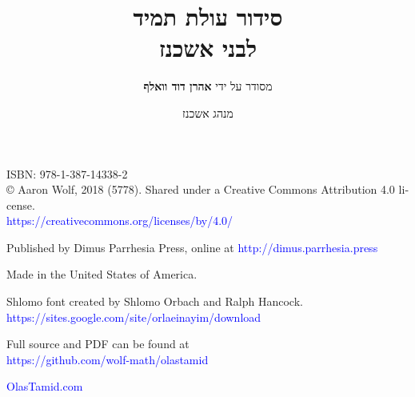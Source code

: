 \documentclass[twoside, openany, parskip=half, 11pt]{book}
\begin{document}
\title{  סידור עולת תמיד \\
לבני אשכנז\\
\vspace{.5in}
 }

\author{מסודר על ידי 
\textbf{אהרן דוד וואלף}}
\date{מנהג אשכנז}

\maketitle

\begin{minipage}{\textwidth}
\begin{english}
\raggedright

ISBN: 978-1-387-14338-2\\

© Aaron Wolf, 2018 (5778). Shared under a Creative Commons Attribution 4.0 license.\\  
\textcolor{blue}{https://creativecommons.org/licenses/by/4.0/}\\ \vspace{\baselineskip}

Published by Dimus Parrhesia Press, online at 
\textcolor{blue}{http://dimus.parrhesia.press}\\  \vspace{\baselineskip}

Made in the United States of America.\\ \vspace{\baselineskip}

Shlomo font created by Shlomo Orbach and Ralph Hancock.\\ \textcolor{blue}{https://sites.google.com/site/orlaeinayim/download}\\ \vspace{\baselineskip}

Full \XeLaTeX \quad source and PDF can be found at\\ \textcolor{blue}{https://github.com/wolf-math/olastamid}\\ \vspace{\baselineskip}

\textcolor{blue}{OlasTamid.com}

\end{english}
\end{minipage}


\clearpage
\end{document}
